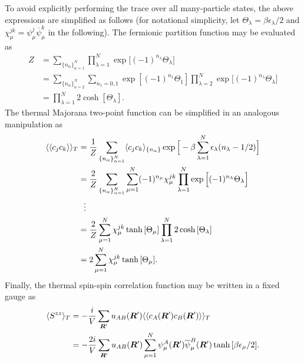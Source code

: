 To avoid explicitly performing the trace over all many-particle states, the above expressions are simplified as follows
(for notational simplicity, let $\Theta_\lambda = \beta \epsilon_\lambda/2$ and $\chi^{jk}_\mu = \psi^j_\mu \overline{\psi}^k_\mu$ in the following).
The fermionic partition function may be evaluated as
%
\begin{align}
	Z 	&= \sum_{\{n_\alpha\}_{\alpha=1}^N} \prod_{\lambda=1}^N \exp{\Big[(-1)^{n_\lambda} \Theta_\lambda\Big]} \nonumber\\
		&= \sum_{\{n_\alpha\}_{\alpha=2}^N} \sum_{n_1=0,1} \exp{[(-1)^{n_1} \Theta_1]} \prod_{\lambda=2}^N \exp{\Big[(-1)^{n_\lambda} \Theta_\lambda\Big]} \nonumber\\
		&= \prod_{\lambda=1}^N 2\cosh{[\Theta_\lambda]}.
\end{align}
%
The thermal Majorana two-point function can be simplified in an analogous manipulation as
%
\begin{align}
	\langle \langle c_j c_k \rangle \rangle_{T} &= \frac{1}{Z} \sum_{\{n_\alpha\}_{\alpha=1}^N} \langle c_j c_k \rangle_{\{n_\alpha\}} \exp{\Big[ -\beta \sum_{\lambda=1}^N \epsilon_\lambda (n_\lambda - 1/2) \Big]} \nonumber\\
							&= \frac{2}{Z} \sum_{\{n_\alpha\}_{\alpha=1}^N} \sum_{\mu=1}^N (-1)^{n_\mu} \chi^{jk}_\mu \prod_{\lambda=1}^N \exp{\Big[ (-1)^{n_\lambda} \Theta_\lambda \Big]} \nonumber\\
							&~~\vdots \nonumber\\
							&= \frac{2}{Z} \sum_{\mu=1}^N \chi^{jk}_\mu \tanh{[\Theta_\mu]} \prod_{\lambda=1}^N 2 \cosh{[\Theta_\lambda]} \nonumber\\
							&= 2 \sum_{\mu=1}^N \chi^{jk}_\mu \tanh{[\Theta_\mu]}.
\end{align}
Finally, the thermal spin-spin correlation function may be written in a fixed gauge as
\begin{align}
	\langle S^{z z} \rangle_T &= -\frac{i}{V} \sum_{\bm{R}'} u_{AB}(\bm{R}') \langle \langle c_A(\bm{R}') c_B(\bm{R}') \rangle \rangle_{T} \nonumber\\
					&= -\frac{2i}{V} \sum_{\bm{R}'} u_{AB}(\bm{R}') \sum_{\mu=1}^N \psi_\mu^A(\bm{R}') \overline{\psi}_\mu^B(\bm{R}') \tanh{[\beta \epsilon_\mu / 2]}.
	\label{eq:chapter07_ThermalSpinSpin}
\end{align}
%


